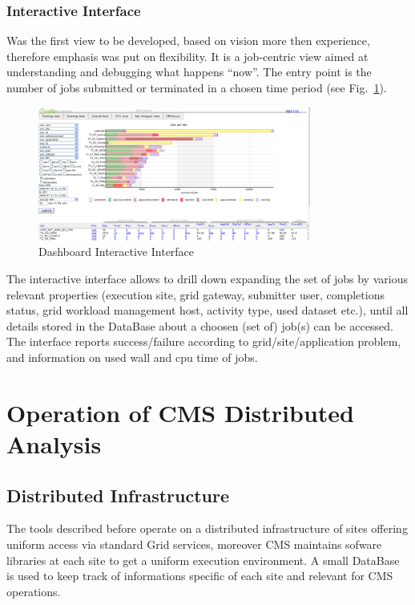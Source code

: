 \subsubsection{Interactive Interface}
Was the first view to be developed, based on
vision more then experience, therefore
emphasis was put on flexibility. It is a job-centric view
aimed at understanding and debugging what happens ``now''.
The entry point is the number of jobs submitted or
terminated in a chosen time period (see Fig.~\ref{fig:Dashboard}).
\begin{figure}
 \includegraphics[width=0.80\textwidth]{figures/DashboardInteractive.png}
\caption{Dashboard Interactive Interface}
\label{fig:Dashboard}
\end{figure}
The interactive interface
allows to drill down expanding the set of jobs by
various relevant properties (execution site, grid gateway,
submitter user, completions status, grid workload management host,
activity type, used dataset etc.), until all details stored in the DataBase
about a choosen (set of) job(s) can be accessed.
The interface reports success/failure
according to grid/site/application problem, and information
on used wall and cpu time of jobs.

\section{Operation of CMS Distributed Analysis}
\label{sec:4}
\subsection{Distributed Infrastructure}
\label{sec:4_1}
The tools described before operate on a distributed infrastructure
of sites offering uniform access via standard Grid services, moreover CMS maintains
sofware libraries at each site to get a uniform execution
environment. A small DataBase is used to keep track of
informations specific of each site and relevant for CMS operations.

